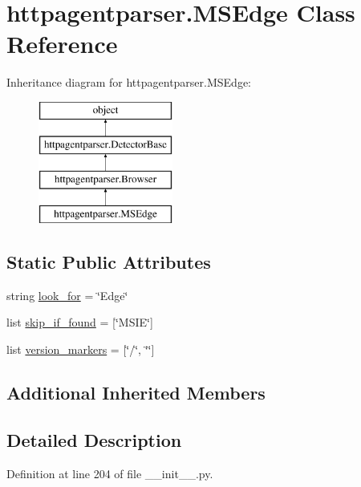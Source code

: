 \hypertarget{classhttpagentparser_1_1_m_s_edge}{}\section{httpagentparser.\+M\+S\+Edge Class Reference}
\label{classhttpagentparser_1_1_m_s_edge}
Inheritance diagram for httpagentparser.\+M\+S\+Edge\+:\begin{figure}[H]
\begin{center}
\leavevmode
\includegraphics[height=4.000000cm]{classhttpagentparser_1_1_m_s_edge}
\end{center}
\end{figure}
\subsection*{Static Public Attributes}
\begin{DoxyCompactItemize}
\item 
string \hyperlink{classhttpagentparser_1_1_m_s_edge_a21d1e6b38ececc0536e2530f0acec6ba}{look\+\_\+for} = \char`\"{}Edge\char`\"{}
\item 
list \hyperlink{classhttpagentparser_1_1_m_s_edge_a777a004e130aab8c9eefbad51cf8a8f5}{skip\+\_\+if\+\_\+found} = \mbox{[}\char`\"{}M\+S\+IE\char`\"{}\mbox{]}
\item 
list \hyperlink{classhttpagentparser_1_1_m_s_edge_aafd0b35d008b5710d033ae445c523e66}{version\+\_\+markers} = \mbox{[}\char`\"{}/\char`\"{}, \char`\"{}\char`\"{}\mbox{]}
\end{DoxyCompactItemize}
\subsection*{Additional Inherited Members}


\subsection{Detailed Description}


Definition at line 204 of file \+\_\+\+\_\+init\+\_\+\+\_\+.\+py.



